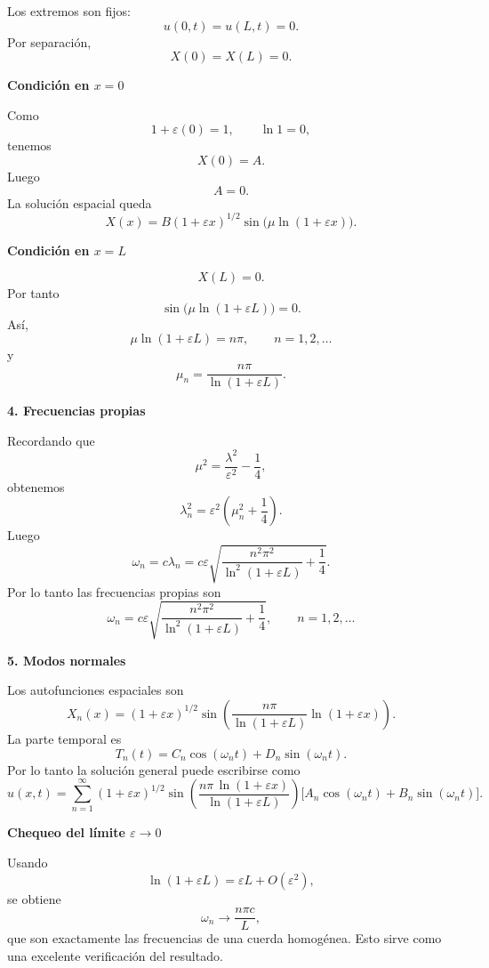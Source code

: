 \documentclass[11pt,spanish]{article}
\newcounter{problema}
\newcommand{\prob}{\stepcounter{problema} \vspace{.5cm} \noindent{\bf Problema \arabic{problema}: }}
\begin{document}
Los extremos son fijos:
$$
u(0,t)=u(L,t)=0.
$$
Por separación,
$$
X(0)=X(L)=0.
$$

{\bf Condición en $x=0$}

Como
$$
1+\varepsilon(0)=1,
\qquad
\ln1=0,
$$
tenemos
$$
X(0)=A.
$$
Luego
$$
A=0.
$$
La solución espacial queda
$$
X(x)
=
B(1+\varepsilon x)^{1/2}
\sin\big(\mu\ln(1+\varepsilon x)\big).
$$

{\bf Condición en $x=L$}

$$
X(L)=0.
$$
Por tanto
$$
\sin\Big(
\mu\ln(1+\varepsilon L)
\Big)=0.
$$
Así,
$$
\mu\ln(1+\varepsilon L)=n\pi,
\qquad n=1,2,\dots
$$
y
$$
\boxed{
\mu_n=
\frac{n\pi}
{\ln(1+\varepsilon L)}
}.
$$

{\bf 4. Frecuencias propias}

Recordando que
$$
\mu^2
=
\frac{\lambda^2}{\varepsilon^2}
-\frac14,
$$
obtenemos
$$
\lambda_n^2
=
\varepsilon^2
\left(
\mu_n^2+\frac14
\right).
$$
Luego
$$
\omega_n
=
c\lambda_n
=
c\varepsilon
\sqrt{
\frac{n^2\pi^2}
{\ln^2(1+\varepsilon L)}
+\frac14
}.
$$
Por lo tanto las frecuencias propias son
$$
\boxed{
\omega_n
=
c\varepsilon
\sqrt{
\frac{n^2\pi^2}
{\ln^2(1+\varepsilon L)}
+\frac14
},
\qquad n=1,2,\ldots
}
$$

{\bf 5. Modos normales}

Los autofunciones espaciales son
$$
\boxed{
X_n(x)
=
(1+\varepsilon x)^{1/2}
\sin\left(
\frac{n\pi}
{\ln(1+\varepsilon L)}
\ln(1+\varepsilon x)
\right).
}
$$
La parte temporal es
$$
T_n(t)
=
C_n\cos(\omega_n t)
+
D_n\sin(\omega_n t).
$$
Por lo tanto la solución general puede escribirse como
$$
\boxed{
u(x,t)
=
\sum_{n=1}^{\infty}
(1+\varepsilon x)^{1/2}
\sin\left(
\frac{n\pi\,\ln(1+\varepsilon x)}
{\ln(1+\varepsilon L)}
\right)
\Big[
A_n\cos(\omega_n t)
+
B_n\sin(\omega_n t)
\Big].
}
$$

{\bf Chequeo del límite $\varepsilon\to0$}

Usando
$$
\ln(1+\varepsilon L)
=
\varepsilon L+O(\varepsilon^2),
$$
se obtiene
$$
\omega_n
\longrightarrow
\frac{n\pi c}{L},
$$
que son exactamente las frecuencias de una cuerda homogénea. Esto sirve como una excelente verificación del resultado.









\end{document}

